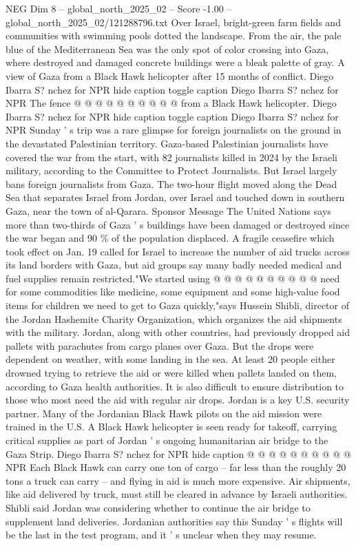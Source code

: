 \begin{textsample}{NEG Dim 8 – global\_north\_2025\_02 – Score -1.00 – global\_north\_2025\_02/121288796.txt}
Over Israel, bright-green farm fields and communities with swimming pools dotted the landscape.
From the air, the pale blue of the Mediterranean Sea was the only spot of color crossing into Gaza, where destroyed and damaged concrete buildings were a bleak palette of gray.
A view of Gaza from a Black Hawk helicopter after 15 months of conflict.
Diego Ibarra S? nchez for NPR hide caption toggle caption Diego Ibarra S? nchez for NPR The fence @ @ @ @ @ @ @ @ @ @ from a Black Hawk helicopter.
Diego Ibarra S? nchez for NPR hide caption toggle caption Diego Ibarra S? nchez for NPR Sunday ' s trip was a rare glimpse for foreign journalists on the ground in the devastated Palestinian territory.
Gaza-based Palestinian journalists have covered the war from the start, with 82 journalists killed in 2024 by the Israeli military, according to the Committee to Protect Journalists.
But Israel largely bans foreign journalists from Gaza.
The two-hour flight moved along the Dead Sea that separates Israel from Jordan, over Israel and touched down in southern Gaza, near the town of al-Qarara.
Sponsor Message The United Nations says more than two-thirds of Gaza ' s buildings have been damaged or destroyed since the war began and 90 \% of the population displaced.
A fragile ceasefire which took effect on Jan. 19 called for Israel to increase the number of aid trucks across its land borders with Gaza, but aid groups say many badly needed medical and fuel supplies remain restricted."We started using @ @ @ @ @ @ @ @ @ @ need for some commodities like medicine, some equipment and some high-value food items for children we need to get to Gaza quickly,"says Hussein Shibli, director of the Jordan Hashemite Charity Organization, which organizes the aid shipments with the military.
Jordan, along with other countries, had previously dropped aid pallets with parachutes from cargo planes over Gaza.
But the drops were dependent on weather, with some landing in the sea.
At least 20 people either drowned trying to retrieve the aid or were killed when pallets landed on them, according to Gaza health authorities.
It is also difficult to ensure distribution to those who most need the aid with regular air drops.
Jordan is a key U.S. security partner.
Many of the Jordanian Black Hawk pilots on the aid mission were trained in the U.S.
A Black Hawk helicopter is seen ready for takeoff, carrying critical supplies as part of Jordan ' s ongoing humanitarian air bridge to the Gaza Strip.
Diego Ibarra S? nchez for NPR hide caption @ @ @ @ @ @ @ @ @ @ NPR Each Black Hawk can carry one ton of cargo -- far less than the roughly 20 tons a truck can carry -- and flying in aid is much more expensive.
Air shipments, like aid delivered by truck, must still be cleared in advance by Israeli authorities.
Shibli said Jordan was considering whether to continue the air bridge to supplement land deliveries.
Jordanian authorities say this Sunday ' s flights will be the last in the test program, and it ' s unclear when they may resume.

\end{textsample}
